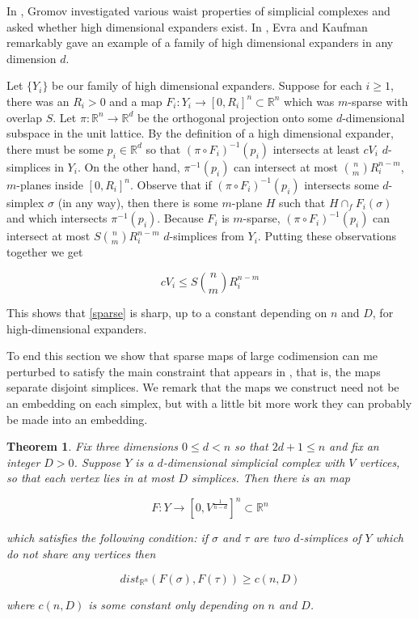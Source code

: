 \documentclass[12pt]{article}
\newtheorem{theorem}{Theorem}
\newcommand{\RR}{\mathbb{R}}
\begin{document}
	\noindent In \cite{GE}, Gromov investigated various waist properties of simplicial complexes and asked whether high dimensional expanders exist. In \cite{EK}, Evra and Kaufman remarkably gave an example of a family of high dimensional expanders in any dimension $d$. 
	
	Let $\{Y_i\}$ be our family of high dimensional expanders. Suppose for each $i \ge 1$, there was an $R_i > 0$ and a map $F_i: Y_i \to [0,R_i]^n \subset \RR^n$ which was $m$-sparse with overlap $S$. Let $\pi: \RR^n \to \RR^d$ be the orthogonal projection onto some $d$-dimensional subspace in the unit lattice. By the definition of a high dimensional expander, there must be some $p_i \in \RR^d$ so that $(\pi \circ F_i)^{-1}(p_i)$ intersects at least $cV_i$ $d$-simplices in $Y_i$. On the other hand, $\pi^{-1}(p_i)$ can intersect at most ${n \choose m}R_i^{n-m}$, $m$-planes inside $[0,R_i]^n$. Observe that if $(\pi \circ F_i)^{-1}(p_i)$ intersects some $d$-simplex $\sigma$ (in any way), then there is some $m$-plane $H$ such that $H \cap_f F_i(\sigma)$  and which intersects $\pi^{-1}(p_i)$. Because $F_i$ is $m$-sparse, $(\pi \circ F_i)^{-1}(p_i)$ can intersect at most $S{n \choose m}R_i^{n-m}$ $d$-simplices from $Y_i$. Putting these observations together we get
	
	$$cV_i \le S{n \choose m}R_i^{n-m}$$
	
	\noindent This shows that \cref{sparse} is sharp, up to a constant depending on $n$ and $D$, for high-dimensional expanders.
	
	To end this section we show that sparse maps of large codimension can me perturbed to satisfy the main constraint that appears in \cite{GG}, that is, the maps separate disjoint simplices. We remark that the maps we construct need not be an embedding on each simplex, but with a little bit more work they can probably be made into an embedding.
	
	\begin{theorem} \label{thick} Fix three dimensions $0 \le d < n$ so that $2d+1 \le n$ and fix an integer $D > 0$. Suppose $Y$ is a $d$-dimensional simplicial complex with $V$ vertices, so that each vertex lies in at most $D$ simplices. Then there is an map
		
	$$F: Y \to [0, V^{\frac{1}{n-d}}]^{n} \subset \mathbb{R}^{n}$$
	
	\noindent which satisfies the following condition: if $\sigma$ and $\tau$ are two $d$-simplices of $Y$ which do not share any vertices then 
	
	$$dist_{\RR^n}(F(\sigma), F(\tau)) \ge c(n,D)$$
	
	\noindent where $c(n,D)$ is some constant only depending on $n$ and $D$.
	\end{theorem}
	
\end{document}
